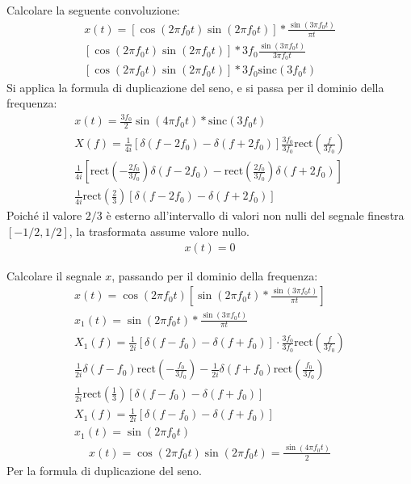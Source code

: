 \documentclass{article}
\newcommand{\rect}{\mathrm{rect}}
\newcommand{\sinc}{\mathrm{sinc}}
\begin{document}
Calcolare la seguente convoluzione:
\begin{gather*}
    x(t)=\left[\cos(2\pi f_0t)\sin(2\pi f_0t)\right]*\displaystyle\frac{\sin(3\pi f_0t)}{\pi t}\\
    \left[\cos(2\pi f_0t)\sin(2\pi f_0t)\right]*\displaystyle3f_0\frac{\sin(3\pi f_0t)}{3\pi f_0t}\\
    \left[\cos(2\pi f_0t)\sin(2\pi f_0t)\right]*3f_0\sinc(3f_0 t)
\end{gather*}
Si applica la formula di duplicazione del seno, e si passa per il dominio della frequenza:
\begin{gather*}
    x(t)=\displaystyle\frac{3f_0}{2}\sin(4\pi f_0t)*\sinc(3f_0t)\\
    X(f)=\displaystyle\frac{1}{4i}\left[\delta(f-2f_0)-\delta(f+2f_0)\right]\frac{3f_0}{3f_0}\rect\left(\frac{f}{3f_0}\right)\\
    \displaystyle\frac{1}{4i}\left[\rect\left(-\frac{2f_0}{3f_0}\right)\delta(f-2f_0)-\rect\left(\frac{2f_0}{3f_0}\right)\delta(f+2f_0)\right]\\
    \displaystyle\frac{1}{4i}\rect\left(\frac{2}{3}\right)\left[\delta(f-2f_0)-\delta(f+2f_0)\right]
\end{gather*}
Poiché il valore $2/3$ è esterno all'intervallo di valori non nulli del segnale finestra $[-1/2,1/2]$, la trasformata assume valore nullo. 
\begin{gather}
    x(t)=0
\end{gather}


Calcolare il segnale $x$, passando per il dominio della frequenza:
\begin{gather*}
    x(t)=\cos(2\pi f_0t)\left[\sin(2\pi f_0t)*\displaystyle\frac{\sin(3\pi f_0t)}{\pi t}\right]\\
    x_1(t)=\sin(2\pi f_0t)*\displaystyle\frac{\sin(3\pi f_0t)}{\pi t}\\
    X_1(f)=\displaystyle\frac{1}{2i}\left[\delta(f-f_0)-\delta(f+f_0)\right]\cdot \frac{3f_0}{3f_0}\rect\left(\frac{f}{3f_0}\right)\\
    \displaystyle\frac{1}{2i}\delta(f-f_0)\rect\left(-\frac{f_0}{3f_0}\right)-\frac{1}{2i}\delta(f+f_0)\rect\left(\frac{f_0}{3f_0}\right)\\
    \displaystyle\frac{1}{2i}\rect\left(\frac{1}{3}\right)\left[\delta(f-f_0)-\delta(f+f_0)\right]\\
    X_1(f)=\displaystyle\frac{1}{2i}\left[\delta(f-f_0)-\delta(f+f_0)\right]\\
    x_1(t)=\sin(2\pi f_0t)
\end{gather*}
\begin{gather}
    x(t)=\cos(2\pi f_0t)\sin(2\pi f_0t)=\displaystyle\frac{\sin(4\pi f_0t)}{2}
\end{gather}
Per la formula di duplicazione del seno. 
\end{document}
